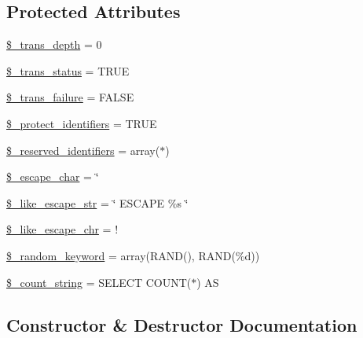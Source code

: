\subsection*{Protected Attributes}
\begin{DoxyCompactItemize}
\item 
\mbox{\hyperlink{class_c_i___d_b__driver_a0724b7f82d62f35ef5e150146ed2a27b}{\$\+\_\+trans\+\_\+depth}} = 0
\item 
\mbox{\hyperlink{class_c_i___d_b__driver_a93acf0189d34131e156c6eb4a48c2b5b}{\$\+\_\+trans\+\_\+status}} = T\+R\+UE
\item 
\mbox{\hyperlink{class_c_i___d_b__driver_afb63c722ff858ef7a4f662ec2930aad3}{\$\+\_\+trans\+\_\+failure}} = F\+A\+L\+SE
\item 
\mbox{\hyperlink{class_c_i___d_b__driver_a2e8a156a3c2abda43a4f160bcb5252e9}{\$\+\_\+protect\+\_\+identifiers}} = T\+R\+UE
\item 
\mbox{\hyperlink{class_c_i___d_b__driver_aa3298c4c62fbee8bb09f1b75b633fb0d}{\$\+\_\+reserved\+\_\+identifiers}} = array(\textquotesingle{}$\ast$\textquotesingle{})
\item 
\mbox{\hyperlink{class_c_i___d_b__driver_aaec2fb0112850159063a8e47ad3aed6e}{\$\+\_\+escape\+\_\+char}} = \textquotesingle{}\char`\"{}\textquotesingle{}
\item 
\mbox{\hyperlink{class_c_i___d_b__driver_adf86ecadf3d0e1ce3f5e0eaeeb3867ae}{\$\+\_\+like\+\_\+escape\+\_\+str}} = \char`\"{} E\+S\+C\+A\+PE \textquotesingle{}\%s\textquotesingle{} \char`\"{}
\item 
\mbox{\hyperlink{class_c_i___d_b__driver_a668acfd923d0342389cd3a614628cf2a}{\$\+\_\+like\+\_\+escape\+\_\+chr}} = \textquotesingle{}!\textquotesingle{}
\item 
\mbox{\hyperlink{class_c_i___d_b__driver_a10213aa6e05f6d924d3277bb1d2fea00}{\$\+\_\+random\+\_\+keyword}} = array(\textquotesingle{}R\+A\+ND()\textquotesingle{}, \textquotesingle{}R\+A\+ND(\%d)\textquotesingle{})
\item 
\mbox{\hyperlink{class_c_i___d_b__driver_a06c80bac2ecbd0557827e96949c23097}{\$\+\_\+count\+\_\+string}} = \textquotesingle{}S\+E\+L\+E\+CT C\+O\+U\+NT($\ast$) AS \textquotesingle{}
\end{DoxyCompactItemize}


\subsection{Constructor \& Destructor Documentation}
\mbox{\label{class_c_i___d_b__driver_a9162320adff1a1a4afd7f2372f753a3e}} 
